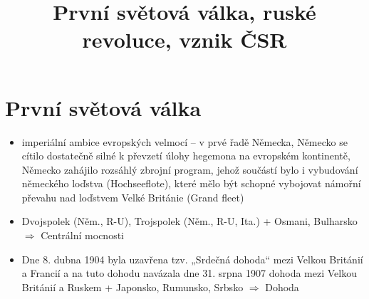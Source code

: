 \documentclass{article}
\title{\vspace{-2cm}První světová válka, ruské revoluce, vznik ČSR\vspace{-1.7cm}}
\date{}
\author{}
\begin{document}
\maketitle

\section*{První světová válka}

\begin{itemize}
  \vspace{-0.5em}
  \setlength\itemsep{0.15em}
  \item imperiální ambice evropských velmocí – v prvé řadě Německa, Německo se cítilo dostatečně silné k převzetí úlohy hegemona na evropském kontinentě, Německo zahájilo rozsáhlý zbrojní program, jehož součástí bylo i vybudování německého loďstva (Hochseeflote), které mělo být schopné vybojovat námořní převahu nad loďstvem Velké Británie (Grand fleet)
  \item Dvojspolek (Něm., R-U), Trojspolek (Něm., R-U, Ita.) + Osmani, Bulharsko $\Rightarrow$ Centrální mocnosti
  \item Dne 8. dubna 1904 byla uzavřena tzv. „Srdečná dohoda“ mezi Velkou Británií a Francií a na tuto dohodu navázala dne 31. srpna 1907 dohoda mezi Velkou Británií a Ruskem + Japonsko, Rumunsko, Srbsko $\Rightarrow$ Dohoda
\end{itemize}
\end{document}
